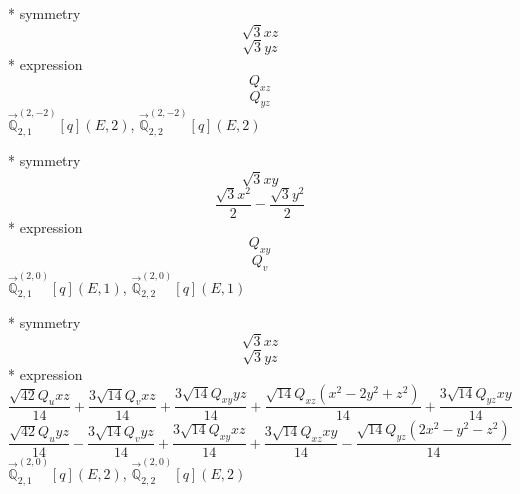 \documentclass[fleqn,8pt]{jsarticle}
\begin{document}
\noindent\quad ** symmetry
\begin{dmath*}
\sqrt{3} x z
\end{dmath*}
\begin{dmath*}
\sqrt{3} y z
\end{dmath*}
\noindent\quad ** expression
\begin{dmath*}
Q_{xz}
\end{dmath*}
\begin{dmath*}
Q_{yz}
\end{dmath*}
\noindent\quad $\vec{\mathbb{Q}}_{2,1}^{(2,-2)}[q](E,2)$, $\vec{\mathbb{Q}}_{2,2}^{(2,-2)}[q](E,2)$

\noindent\quad ** symmetry
\begin{dmath*}
\sqrt{3} x y
\end{dmath*}
\begin{dmath*}
\frac{\sqrt{3} x^{2}}{2} - \frac{\sqrt{3} y^{2}}{2}
\end{dmath*}
\noindent\quad ** expression
\begin{dmath*}
Q_{xy}
\end{dmath*}
\begin{dmath*}
Q_{v}
\end{dmath*}
\noindent\quad $\vec{\mathbb{Q}}_{2,1}^{(2,0)}[q](E,1)$, $\vec{\mathbb{Q}}_{2,2}^{(2,0)}[q](E,1)$

\noindent\quad ** symmetry
\begin{dmath*}
\sqrt{3} x z
\end{dmath*}
\begin{dmath*}
\sqrt{3} y z
\end{dmath*}
\noindent\quad ** expression
\begin{dmath*}
\frac{\sqrt{42} Q_{u} x z}{14} + \frac{3 \sqrt{14} Q_{v} x z}{14} + \frac{3 \sqrt{14} Q_{xy} y z}{14} + \frac{\sqrt{14} Q_{xz} \left(x^{2} - 2 y^{2} + z^{2}\right)}{14} + \frac{3 \sqrt{14} Q_{yz} x y}{14}
\end{dmath*}
\begin{dmath*}
\frac{\sqrt{42} Q_{u} y z}{14} - \frac{3 \sqrt{14} Q_{v} y z}{14} + \frac{3 \sqrt{14} Q_{xy} x z}{14} + \frac{3 \sqrt{14} Q_{xz} x y}{14} - \frac{\sqrt{14} Q_{yz} \left(2 x^{2} - y^{2} - z^{2}\right)}{14}
\end{dmath*}
\noindent\quad $\vec{\mathbb{Q}}_{2,1}^{(2,0)}[q](E,2)$, $\vec{\mathbb{Q}}_{2,2}^{(2,0)}[q](E,2)$
\end{document}
